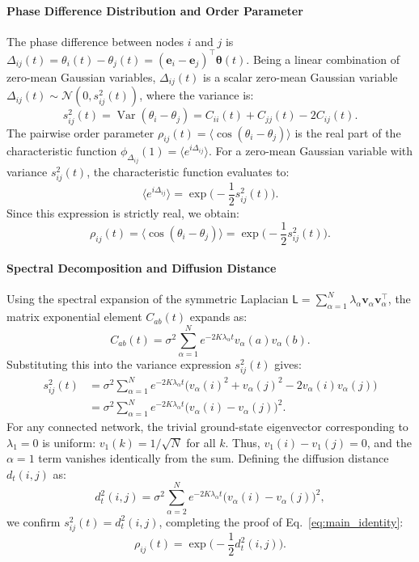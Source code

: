 \documentclass[twocolumn,aps,prl,superscriptaddress,nofootinbib]{revtex4-2}
\theoremstyle{plain}
\theoremstyle{definition}
\newcommand{\Lap}{\mathsf{L}}
\begin{document}
\paragraph{Phase Difference Distribution and Order Parameter}
The phase difference between nodes $i$ and $j$ is $\Delta_{ij}(t) = \theta_i(t) - \theta_j(t) = (\bm e_i - \bm e_j)^\top \bm\theta(t)$. Being a linear combination of zero-mean Gaussian variables, $\Delta_{ij}(t)$ is a scalar zero-mean Gaussian variable $\Delta_{ij}(t) \sim \mathcal{N}(0, s_{ij}^2(t))$, where the variance is:
\begin{equation}
s_{ij}^2(t) = \operatorname{Var}(\theta_i - \theta_j) = C_{ii}(t) + C_{jj}(t) - 2 C_{ij}(t).
\end{equation}
The pairwise order parameter $\rho_{ij}(t) = \langle \cos(\theta_i - \theta_j) \rangle$ is the real part of the characteristic function $\phi_{\Delta_{ij}}(1) = \langle e^{i \Delta_{ij}} \rangle$. For a zero-mean Gaussian variable with variance $s_{ij}^2(t)$, the characteristic function evaluates to:
\begin{equation}
\langle e^{i \Delta_{ij}} \rangle = \exp\Big( -\frac{1}{2} s_{ij}^2(t) \Big).
\end{equation}
Since this expression is strictly real, we obtain:
\begin{equation}
\rho_{ij}(t) = \langle \cos(\theta_i - \theta_j) \rangle = \exp\Big( -\frac{1}{2} s_{ij}^2(t) \Big).
\end{equation}

\paragraph{Spectral Decomposition and Diffusion Distance}
Using the spectral expansion of the symmetric Laplacian $\Lap = \sum_{\alpha=1}^N \lambda_\alpha \bm v_\alpha \bm v_\alpha^\top$, the matrix exponential element $C_{ab}(t)$ expands as:
\begin{equation}
C_{ab}(t) = \sigma^2 \sum_{\alpha=1}^N e^{-2K \lambda_\alpha t} v_\alpha(a) v_\alpha(b).
\end{equation}
Substituting this into the variance expression $s_{ij}^2(t)$ gives:
\begin{align}
s_{ij}^2(t) &= \sigma^2 \sum_{\alpha=1}^N e^{-2K \lambda_\alpha t} \Big( v_\alpha(i)^2 + v_\alpha(j)^2 - 2 v_\alpha(i) v_\alpha(j) \Big) \nonumber \\
&= \sigma^2 \sum_{\alpha=1}^N e^{-2K \lambda_\alpha t} \big( v_\alpha(i) - v_\alpha(j) \big)^2.
\end{align}
For any connected network, the trivial ground-state eigenvector corresponding to $\lambda_1 = 0$ is uniform: $v_1(k) = 1/\sqrt{N}$ for all $k$. Thus, $v_1(i) - v_1(j) = 0$, and the $\alpha = 1$ term vanishes identically from the sum. Defining the diffusion distance $d_t(i,j)$ as:
\begin{equation}
d_t^2(i,j) = \sigma^2 \sum_{\alpha=2}^N e^{-2K\lambda_\alpha t} \big( v_\alpha(i) - v_\alpha(j) \big)^2,
\end{equation}
we confirm $s_{ij}^2(t) = d_t^2(i,j)$, completing the proof of Eq.~\eqref{eq:main_identity}:
\begin{equation}
\rho_{ij}(t) = \exp\Big( -\frac{1}{2} d_t^2(i,j) \Big).
\end{equation}
\end{document}
